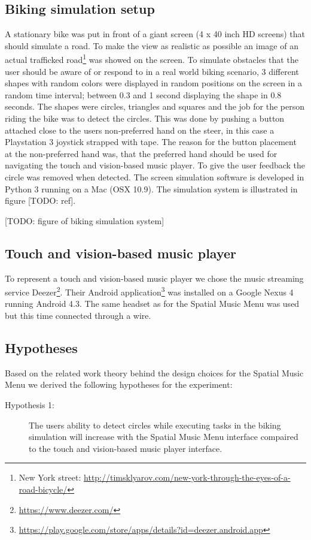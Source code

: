 \subsection{Biking simulation setup}
A stationary bike was put in front of a giant screen (4 x 40 inch HD screens) that should simulate a road. To make the view as realistic as possible an image of an actual trafficked road\footnote{New York street: \url{http://timsklyarov.com/new-york-through-the-eyes-of-a-road-bicycle/}} was showed on the screen. To simulate obstacles that the user should be aware of or respond to in a real world biking scenario, 3 different shapes with random colors were displayed in random positions on the screen in a random time interval; between 0.3 and 1 second displaying the shape in 0.8 seconds. The shapes were circles, triangles and squares and the job for the person riding the bike was to detect the circles. This was done by pushing a button attached close to the users non-preferred hand on the steer, in this case a Playstation 3 joystick strapped with tape. The reason for the button placement at the non-preferred hand was, that the preferred hand should be used for navigating the touch and vision-based music player. To give the user feedback the circle was removed when detected. The screen simulation software is developed in Python 3 running on a Mac (OSX 10.9). The simulation system is illustrated in figure [TODO: ref].

[TODO: figure of biking simulation system]

\subsection{Touch and vision-based music player}
To represent a touch and vision-based music player we chose the music streaming service Deezer\footnote{\url{https://www.deezer.com/}}. Their Android application\footnote{\url{https://play.google.com/store/apps/details?id=deezer.android.app}} was installed on a Google Nexus 4 running Android 4.3. The same headset as for the Spatial Music Menu was used but this time connected through a wire.

\subsection{Hypotheses}
Based on the related work theory behind the design choices for the Spatial Music Menu we derived the following hypotheses for the experiment:

\begin{description}
\item[Hypothesis 1:] The users ability to detect circles while executing tasks in the biking simulation will increase with the Spatial Music Menu interface compaired to the touch and vision-based music player interface.
\end{description}

